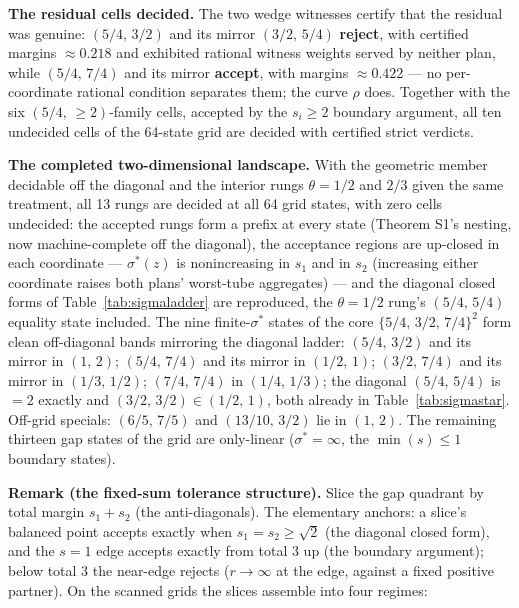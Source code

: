 \documentclass[3p,11pt]{elsarticle}
\begin{document}
\textbf{The residual cells decided.} The two wedge witnesses
certify that the residual was genuine: \((5/4,\, 3/2)\) and its
mirror \((3/2,\, 5/4)\) \textbf{reject}, with certified margins
\(\approx 0.218\) and exhibited rational witness weights served
by neither plan, while \((5/4,\, 7/4)\) and its mirror
\textbf{accept}, with margins \(\approx 0.422\) --- no
per-coordinate rational condition separates them; the curve
\(\rho\) does. Together with the six \((5/4,\, \ge 2)\)-family
cells, accepted by the \(s_i \ge 2\) boundary argument, all ten
undecided cells of the 64-state grid are decided with certified
strict verdicts.

\textbf{The completed two-dimensional landscape.} With the
geometric member decidable off the diagonal and the interior
rungs \(\theta = 1/2\) and \(2/3\) given the same treatment, all
13 rungs are decided at all 64 grid states, with zero cells
undecided: the accepted rungs form a prefix at every state
(Theorem S1's nesting, now machine-complete off the diagonal),
the acceptance regions are up-closed in each coordinate ---
\(\sigma^*(z)\) is nonincreasing in \(s_1\) and in \(s_2\)
(increasing either coordinate raises both plans' worst-tube
aggregates) --- and the diagonal closed forms of
Table~\ref{tab:sigmaladder} are reproduced, the \(\theta = 1/2\)
rung's \((5/4,\, 5/4)\) equality state included. The nine
finite-\(\sigma^*\) states of the core \(\{5/4,\, 3/2,\, 7/4\}^2\)
form clean off-diagonal bands mirroring the diagonal ladder:
\((5/4,\, 3/2)\) and its mirror in \((1,\, 2)\); \((5/4,\, 7/4)\)
and its mirror in \((1/2,\, 1)\); \((3/2,\, 7/4)\) and its mirror
in \((1/3,\, 1/2)\); \((7/4,\, 7/4)\) in \((1/4,\, 1/3)\); the
diagonal \((5/4,\, 5/4)\) is \(= 2\) exactly and \((3/2,\, 3/2)
\in (1/2,\, 1)\), both already in Table~\ref{tab:sigmastar}.
Off-grid specials: \((6/5,\, 7/5)\) and \((13/10,\, 3/2)\) lie
in \((1,\, 2)\). The remaining thirteen gap states of the grid
are only-linear (\(\sigma^* = \infty\), the \(\min(s) \le 1\)
boundary states).

\textbf{Remark (the fixed-sum tolerance structure).} Slice the
gap quadrant by total margin \(s_1 + s_2\) (the anti-diagonals).
The elementary anchors: a slice's balanced point accepts exactly
when \(s_1 = s_2 \ge \sqrt{2}\) (the diagonal closed form), and
the \(s = 1\) edge accepts exactly from total \(3\) up (the
boundary argument); below total \(3\) the near-edge rejects
(\(r \to \infty\) at the edge, against a fixed positive
partner). On the scanned grids the slices assemble into four
regimes:
\end{document}

